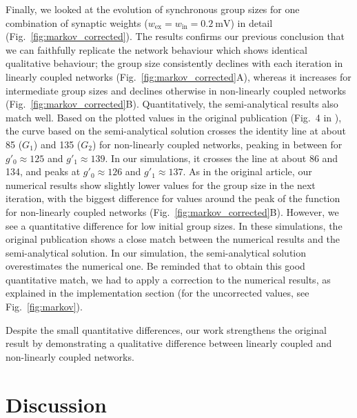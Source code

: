 \documentclass[10pt,a4paper,onecolumn]{article}
\begin{document}
Finally, we looked at the evolution of synchronous group sizes for one combination of synaptic weights ($w_\text{ex}=w_\text{in}=\SI{0.2}{\milli\volt}$) in detail (Fig.~\ref{fig:markov_corrected}). The results confirms our previous conclusion that we can faithfully replicate the network behaviour which shows identical qualitative behaviour; the group size consistently declines with each iteration in linearly coupled networks (Fig.~\ref{fig:markov_corrected}A), whereas it increases for intermediate group sizes and declines otherwise in non-linearly coupled networks (Fig.~\ref{fig:markov_corrected}B). Quantitatively, the semi-analytical results also match well. Based on the plotted values in the original publication (Fig.~4 in \cite{Memmesheimer2012}), the curve based on the semi-analytical solution crosses the identity line at about 85 ($G_1$) and 135 ($G_2$) for non-linearly coupled networks, peaking in between for $g'_0\approx125$ and $g'_1\approx139$. In our simulations, it crosses the line at about 86 and 134, and peaks at $g'_0\approx126$ and $g'_1\approx137$. As in the original article, our numerical results show slightly lower values for the group size in the next iteration, with the biggest difference for values around the peak of the function for non-linearly coupled networks (Fig.~\ref{fig:markov_corrected}B). However, we see a quantitative difference for low initial group sizes. In these simulations, the original publication shows a close match between the numerical results and the semi-analytical solution. In our simulation, the semi-analytical solution overestimates the numerical one.
Be reminded that to obtain this good quantitative match, we had to apply a correction to the numerical results, as explained in the implementation section (for the uncorrected values, see Fig.~\ref{fig:markov}).

Despite the small quantitative differences, our work strengthens the original result by demonstrating a qualitative difference between linearly coupled and non-linearly coupled networks.

\section*{Discussion}
\end{document}
